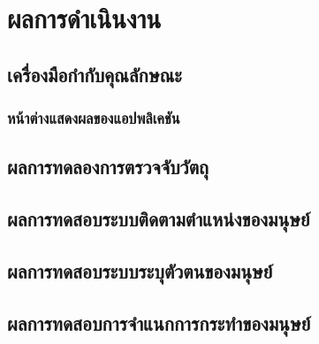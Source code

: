 \chapter{ผลการดำเนินงาน}
\section{เครื่องมือกำกับคุณลักษณะ}
\subsection{หน้าต่างแสดงผลของแอปพลิเคชัน}


\clearpage
\section{ผลการทดลองการตรวจจับวัตถุ}

\clearpage
\section{ผลการทดสอบระบบติดตามตำแหน่งของมนุษย์}

\clearpage
\section{ผลการทดสอบระบบระบุตัวตนของมนุษย์}

\clearpage
\section{ผลการทดสอบการจำแนกการกระทำของมนุษย์}
